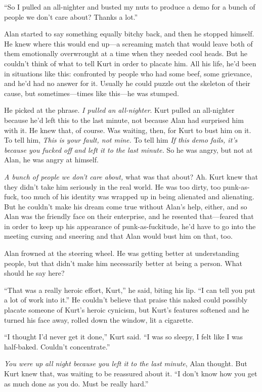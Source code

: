 ``So I pulled an all-nighter and busted my nuts to produce a demo for
a bunch of people we don't care about?  Thanks a lot.''

Alan started to say something equally bitchy back, and then he stopped
himself.  He knew where this would end up---a screaming match that
would leave both of them emotionally overwrought at a time when they
needed cool heads.  But he couldn't think of what to tell Kurt in
order to placate him.  All his life, he'd been in situations like
this:  confronted by people who had some beef, some grievance, and
he'd had no answer for it.  Usually he could puzzle out the skeleton
of their cause, but sometimes---times like this---he was stumped.

He picked at the phrase.  \textit{I pulled an all-nighter}.  Kurt
pulled an all-nighter because he'd left this to the last minute, not
because Alan had surprised him with it.  He knew that, of course.  Was
waiting, then, for Kurt to bust him on it.  To tell him, \textit{This
is your fault, not mine.} To tell him \textit{If this demo fails, it's
because you fucked off and left it to the last minute.} So he was
angry, but not at Alan, he was angry at himself.

\textit{A bunch of people we don't care about,} what was that about? 
Ah.  Kurt knew that they didn't take him seriously in the real world. 
He was too dirty, too punk-as-fuck, too much of his identity was
wrapped up in being alienated and alienating.  But he couldn't make
his dream come true without Alan's help, either, and so Alan was the
friendly face on their enterprise, and he resented that---feared that
in order to keep up his appearance of punk-as-fuckitude, he'd have to
go into the meeting cursing and sneering and that Alan would bust him
on that, too.

Alan frowned at the steering wheel.  He was getting better at
understanding people, but that didn't make him necessarily better at
being a person.  What should he say here?

``That was a really heroic effort, Kurt,'' he said, biting his lip. 
``I can tell you put a lot of work into it.'' He couldn't believe that
praise this naked could possibly placate someone of Kurt's heroic
cynicism, but Kurt's features softened and he turned his face away,
rolled down the window, lit a cigarette.

``I thought I'd never get it done,'' Kurt said.  ``I was so sleepy, I
felt like I was half-baked.  Couldn't concentrate.''

\textit{You were up all night because you left it to the last minute},
Alan thought.  But Kurt knew that, was waiting to be reassured about
it.  ``I don't know how you get as much done as you do.  Must be
really hard.''

